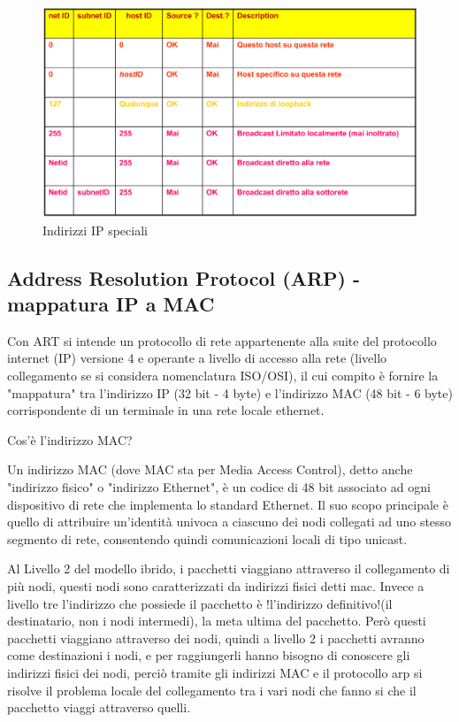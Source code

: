 \begin{figure}[h!]
    \centering
    \includegraphics[width=1\textwidth]{images/indirizziipspeciali.png}
    \caption{Indirizzi IP speciali}
    \label{fig:indirizziipspeciali}
\end{figure}


\newpage
\subsection{Address Resolution Protocol (ARP) - mappatura IP a MAC}
Con ART si intende un protocollo di rete appartenente alla suite del protocollo internet (IP) versione 4 e operante a livello di accesso alla rete (livello collegamento se si considera nomenclatura ISO/OSI), il cui compito è fornire la "mappatura" tra l'indirizzo IP (32 bit - 4 byte) e l'indirizzo MAC (48 bit - 6 byte) corrispondente di un terminale in una rete locale ethernet.

Cos'è l'indirizzo MAC? 

Un indirizzo MAC (dove MAC sta per Media Access Control), detto anche "indirizzo fisico" o "indirizzo Ethernet", è un codice di 48 bit associato ad ogni dispositivo di rete che implementa lo standard Ethernet. Il suo scopo principale è quello di attribuire un'identità univoca a ciascuno dei nodi collegati ad uno stesso segmento di rete, consentendo quindi comunicazioni locali di tipo unicast. 

Al Livello 2 del modello ibrido, i pacchetti viaggiano attraverso il collegamento di più nodi, questi nodi sono caratterizzati da indirizzi fisici detti mac. 
Invece a livello tre l'indirizzo che possiede il pacchetto è !l'indirizzo definitivo!(il destinatario, non i nodi intermedi), la meta ultima del pacchetto. Però questi pacchetti viaggiano attraverso dei nodi, quindi a livello 2 i pacchetti avranno come destinazioni i nodi, e per raggiungerli hanno bisogno di conoscere gli indirizzi fisici dei nodi, perciò tramite gli indirizzi MAC e il protocollo arp si risolve il problema locale del collegamento tra i vari nodi che fanno si che il pacchetto viaggi attraverso quelli.

